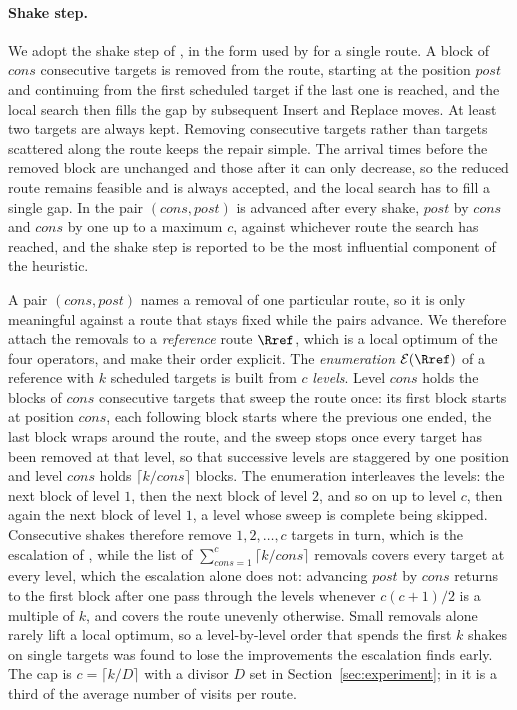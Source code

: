 \paragraph{Shake step.}
We adopt the shake step of \citep{vansteenwegen2009iterated}, in the form used by \citep{gunawan2015iterated} for a single route. A block of $\mathit{cons}$ consecutive targets is removed from the route, starting at the position $\mathit{post}$ and continuing from the first scheduled target if the last one is reached, and the local search then fills the gap by subsequent Insert and Replace moves. At least two targets are always kept. Removing consecutive targets rather than targets scattered along the route keeps the repair simple. The arrival times before the removed block are unchanged and those after it can only decrease, so the reduced route remains feasible and is always accepted, and the local search has to fill a single gap. In \citep{vansteenwegen2009iterated} the pair $(\mathit{cons}, \mathit{post})$ is advanced after every shake, $\mathit{post}$ by $\mathit{cons}$ and $\mathit{cons}$ by one up to a maximum $c$, against whichever route the search has reached, and the shake step is reported to be the most influential component of the heuristic.

A pair $(\mathit{cons}, \mathit{post})$ names a removal of one particular route, so it is only meaningful against a route that stays fixed while the pairs advance. We therefore attach the removals to a \emph{reference} route $\Rref$, which is a local optimum of the four operators, and make their order explicit. The \emph{enumeration} $\mathcal{E}(\Rref)$ of a reference with $k$ scheduled targets is built from $c$ \emph{levels}. Level $\mathit{cons}$ holds the blocks of $\mathit{cons}$ consecutive targets that sweep the route once: its first block starts at position $\mathit{cons}$, each following block starts where the previous one ended, the last block wraps around the route, and the sweep stops once every target has been removed at that level, so that successive levels are staggered by one position and level $\mathit{cons}$ holds $\lceil k / \mathit{cons} \rceil$ blocks. The enumeration interleaves the levels: the next block of level $1$, then the next block of level $2$, and so on up to level $c$, then again the next block of level $1$, a level whose sweep is complete being skipped. Consecutive shakes therefore remove $1, 2, \ldots, c$ targets in turn, which is the escalation of \citep{vansteenwegen2009iterated}, while the list of $\sum_{\mathit{cons} = 1}^{c} \lceil k / \mathit{cons} \rceil$ removals covers every target at every level, which the escalation alone does not: advancing $\mathit{post}$ by $\mathit{cons}$ returns to the first block after one pass through the levels whenever $c(c+1)/2$ is a multiple of $k$, and covers the route unevenly otherwise. Small removals alone rarely lift a local optimum, so a level-by-level order that spends the first $k$ shakes on single targets was found to lose the improvements the escalation finds early. The cap is $c = \lceil k / D \rceil$ with a divisor $D$ set in Section~\ref{sec:experiment}; in \citep{vansteenwegen2009iterated} it is a third of the average number of visits per route.

